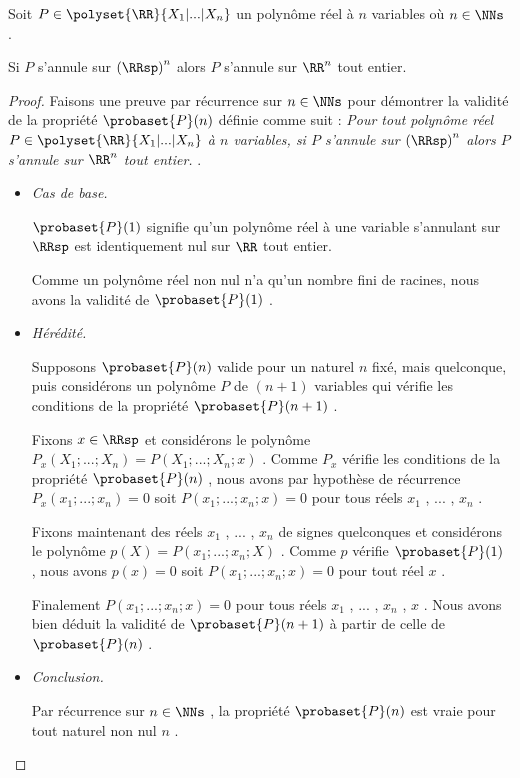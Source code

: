 \medskip

\begin{fact} \label{poly-nullity-pos}
	Soit $P \in \polyset{\RR}{X_1 | ... | X_n}$ un polynôme réel à $n$ variables où $n \in \NNs$ .
	
	\smallskip
	
	Si $P$ s'annule sur $\left( \RRsp \right)^n$ alors $P$ s'annule sur $\RR^n$ tout entier. 
\end{fact}


\begin{proof}
	Faisons une preuve par récurrence sur $n \in \NNs$ pour démontrer la validité de la propriété $\probaset{P}(n)$ définie comme suit :
	\emph{\og 
		Pour tout polynôme réel $P \in \polyset{\RR}{X_1 | ... | X_n}$ à $n$ variables,
		si $P$ s'annule sur $\left( \RRsp \right)^n$ alors $P$ s'annule sur $\RR^n$ tout entier. 
	\fg}.

	\begin{itemize}[label=\small\textbullet]
		\item \emph{Cas de base.}
	
		\noindent
		$\probaset{P}(1)$ signifie qu'un polynôme réel à une variable s'annulant sur $\RRsp$ est identiquement nul sur $\RR$ tout entier.
		
		\smallskip
		\noindent
		Comme un polynôme réel non nul n'a qu'un nombre fini de racines, nous avons la validité de $\probaset{P}(1)$ .


		\medskip
		\item \emph{Hérédité.}
	
		\noindent
		Supposons $\probaset{P}(n)$ valide pour un naturel $n$ fixé, mais quelconque, puis considérons un polynôme $P$ de $(n + 1)$ variables qui vérifie les conditions de la propriété $\probaset{P}(n + 1)$ .
	
		\smallskip
		\noindent
		Fixons $x \in \RRsp$ et considérons le polynôme $P_x(X_1 ; ... ; X_n) = P(X_1 ; ... ; X_n ; x)$ .
		Comme $P_x$  vérifie les conditions de la propriété $\probaset{P}(n)$ ,
		nous avons par hypothèse de récurrence 
		$P_x(x_1 ; ... ; x_n) = 0$ soit $P(x_1 ; ... ; x_n ; x) = 0$ pour tous réels $x_1$ , ... , $x_n$ .
	
		\smallskip
		\noindent
		Fixons maintenant des réels $x_1$ , ... , $x_n$ de signes quelconques et considérons le polynôme $p(X) = P(x_1 ; ... ; x_n ; X)$ .
		Comme $p$ vérifie $\probaset{P}(1)$ , nous avons $p(x) = 0$ soit $P(x_1 ; ... ; x_n ; x) = 0$ pour tout réel $x$ .
	
		\smallskip
		\noindent
		Finalement $P(x_1 ; ... ; x_n ; x) = 0$ pour tous réels $x_1$ , ... , $x_n$ , $x$ .
		Nous avons bien déduit la validité de $\probaset{P}(n+1)$ à partir de celle de $\probaset{P}(n)$ .


	\medskip
	\item \emph{Conclusion.}
	
	\smallskip
	\noindent
	Par récurrence sur $n \in \NNs$ , la propriété $\probaset{P}(n)$ est vraie pour tout naturel non nul $n$ .
	\end{itemize}
\end{proof}


